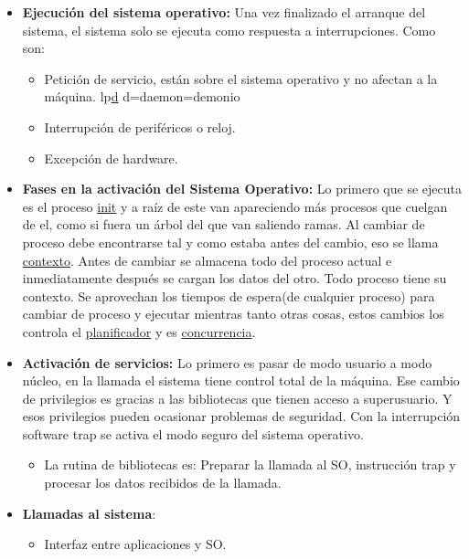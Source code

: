 \documentclass[12pt, twoside, openright]{report} %
\begin{document}
\begin{itemize}
\item \textbf{Ejecución del sistema operativo:} Una vez finalizado el
  arranque del sistema, el sistema solo se ejecuta como respuesta a
  interrupciones. Como son:
  

  \begin{itemize}
  \item Petición de servicio, están sobre el sistema operativo y no afectan
    a la máquina. lp\underline{d} d=daemon=demonio
    
  \item Interrupción de periféricos o reloj.
    
  \item Excepción de hardware.
    
  \end{itemize}
\item \textbf{Fases en la activación del Sistema Operativo:} Lo primero que
  se ejecuta es el proceso \underline{init} y a raíz de este van
  apareciendo más procesos que cuelgan de el, como si fuera un árbol del
  que van saliendo ramas. Al cambiar de proceso debe encontrarse tal y
  como estaba antes del cambio, eso se llama \underline{contexto}. Antes
  de cambiar se almacena todo del proceso actual e inmediatamente
  después se cargan los datos del otro. Todo proceso tiene su contexto.
  Se aprovechan los tiempos de espera(de cualquier proceso) para cambiar
  de proceso y ejecutar mientras tanto otras cosas, estos cambios los
  controla el \underline{planificador} y es \underline{concurrencia}.
  
\item \textbf{Activación de servicios:} Lo primero es pasar de modo usuario
  a modo núcleo, en la llamada el sistema tiene control total de la
  máquina. Ese cambio de privilegios es gracias a las bibliotecas que
  tienen acceso a superusuario. Y esos privilegios pueden ocasionar
  problemas de seguridad. Con la interrupción software trap se activa el
  modo seguro del sistema operativo.
  

  \begin{itemize}
  \item La rutina de bibliotecas es: Preparar la llamada al SO, instrucción
    trap y procesar los datos recibidos de la llamada.
    
  \end{itemize}
\item \textbf{Llamadas al sistema}:
  

  \begin{itemize}
  \item Interfaz entre aplicaciones y SO.
    

\end{itemize}
\end{itemize}
\end{document}
